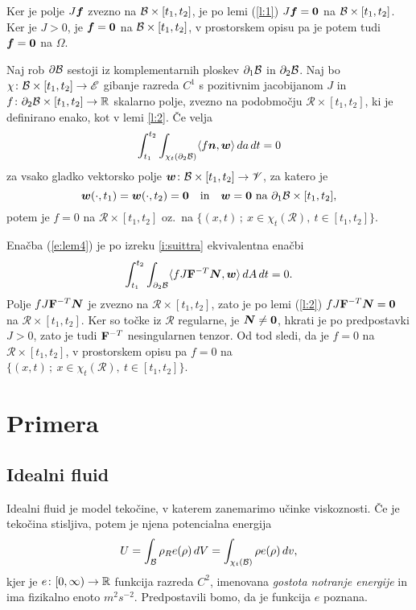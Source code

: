 	Ker je polje $J\boldsymbol f$ zvezno na $\mathcal B\times[t_1,t_2]$, je
	po lemi (\ref{l:1}) $J\boldsymbol f=\boldsymbol 0$
	na $\mathcal B\times[t_1,t_2]$. Ker je $J>0$, je $\boldsymbol f=\boldsymbol 0$ na $\mathcal B\times[t_1,t_2]$,
	v prostorskem opisu pa je potem tudi $\boldsymbol f=\boldsymbol 0$ na $\Omega$.
\endproof

\begin{lema} \label{lema4}
	Naj rob $\partial \mathcal B$ sestoji iz komplementarnih ploskev $\partial_1 \mathcal B$ in $\partial_2 \mathcal B$.
	Naj bo $\chi\colon \mathcal B\times[t_1,t_2]\to\mathscr E$ gibanje razreda $C^1$ s pozitivnim jacobijanom $J$ in
	$f\colon\partial_2 \mathcal B\times[t_1,t_2]\to\mathbb R$ skalarno polje, zvezno na podobmočju $\mathcal{R}\times[t_1,t_2]$,
	ki je definirano enako, kot v lemi \ref{l:2}.
	Če velja
	\begin{equation}\label{e:lem4}
		\int_{t_1}^{t_2}\int_{\chi_t(\partial_2 \mathcal B)}\langle f\boldsymbol n,\boldsymbol w\rangle\,da\,dt=0
	\end{equation}
	za vsako gladko vektorsko polje $\boldsymbol w\colon \mathcal B\times[t_1,t_2]\to\mathscr V$, za katero je
	\[
		\boldsymbol w(\cdot,t_1)=\boldsymbol w(\cdot,t_2)=\boldsymbol 0\quad\textrm{in}
		\quad\boldsymbol w=\boldsymbol 0\ \textrm{na}\ \partial_1 \mathcal B\times[t_1,t_2],
	\]
	potem je $f=0$ na $\mathcal{R}\times[t_1,t_2]$ oz.~na $\{(x,t)\,;\ x\in\chi_t(\mathcal{R}),\ t\in[t_1,t_2] \}$.
\end{lema}

\proof
	Enačba (\ref{e:lem4}) je po izreku \ref{i:suittra} ekvivalentna enačbi
	\[ \int_{t_1}^{t_2}\int_{\partial_2 \mathcal B}\langle fJ\mathbf F^{-T}\boldsymbol N,\boldsymbol w\rangle\,dA\,dt=0. \]
	Polje $fJ\mathbf F^{-T}\boldsymbol N$ je zvezno na $\mathcal{R}\times[t_1,t_2]$,
	zato je po lemi (\ref{l:2}) $fJ\mathbf F^{-T}\boldsymbol N=\boldsymbol 0$ na $\mathcal{R}\times[t_1,t_2]$.
	Ker so točke iz $\mathcal{R}$ regularne, je $\boldsymbol N\neq \boldsymbol 0$, hkrati je po predpostavki $J>0$,
	zato je tudi $\mathbf F^{-T}$ nesingularnen tenzor. Od tod sledi, da je $f=0$ na $\mathcal{R}\times[t_1,t_2]$,
	v prostorskem opisu pa $f=0$ na $\{(x,t)\,;\ x\in\chi_t(\mathcal{R}),\ t\in[t_1,t_2] \}$.
\endproof


\section{Primera}


\subsection{Idealni fluid}


Idealni fluid je model tekočine, v katerem zanemarimo učinke viskoznosti. Če je tekočina
stisljiva, potem je njena potencialna energija
\[ U=\int_{\mathcal B}\rho_R e(\rho)\,dV=\int_{\chi_t(\mathcal B)}\rho e(\rho)\,dv, \]
kjer je $e\colon[0,\infty)\to\mathbb R$ funkcija razreda $C^2$, imenovana
\emph{gostota notranje energije} in ima fizikalno enoto $m^2s^{-2}$.
Predpostavili bomo, da je funkcija $e$ poznana.

